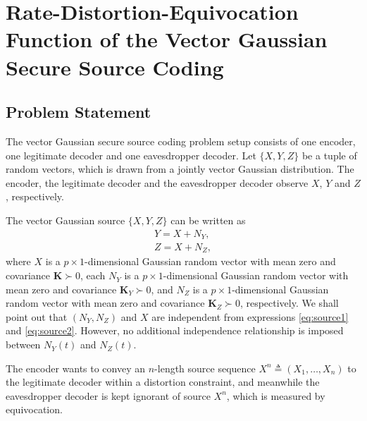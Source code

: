 \documentclass[journal,final, onecolumn]{IEEEtran}
\begin{document}
\section{Rate-Distortion-Equivocation Function of the Vector Gaussian Secure Source Coding}\label{sec5}

\subsection{Problem Statement}

The vector Gaussian secure source coding problem setup consists of one encoder, one legitimate decoder and one eavesdropper decoder. Let $\{{X}, {Y}, {Z}\}$ be a tuple of random vectors, which is drawn from a jointly vector Gaussian distribution. The encoder, the legitimate decoder and the eavesdropper decoder observe ${X}$, ${Y}$ and ${Z}$, respectively.

The vector Gaussian source $\{{X}, {Y}, {Z}\}$ can be written as
\begin{align}
{Y} =  {X} + {N}_{Y}, \label{eq:source1}\\
{Z} =  {X} + {N}_{Z}, \label{eq:source2}
\end{align}
where ${X}$ is a $p\times1$-dimensional Gaussian random vector with mean zero and covariance $\boldsymbol{K} \succ0$, each ${N}_{Y}$ is a $p\times1$-dimensional Gaussian random vector with mean zero and covariance $\boldsymbol{K}_{Y} \succ 0 $, and ${N}_{Z}$ is a $p\times1$-dimensional Gaussian random vector with mean zero and covariance $\boldsymbol{K}_{Z} \succ 0 $, respectively. We shall point out that $({N}_{Y}, {N}_{Z})$ and ${X}$ are independent from expressions \eqref{eq:source1} and \eqref{eq:source2}. However, no additional independence relationship is imposed between ${N}_{Y}(t)$ and ${N}_{Z}(t)$.

The encoder wants to convey an $n$-length source sequence ${X}^{n} \triangleq ( X_{1}, \ldots, {X}_{n} )$ to the legitimate decoder within a distortion constraint, and meanwhile the eavesdropper decoder is kept ignorant of source ${X}^{n}$, which is measured by equivocation.
\end{document}
